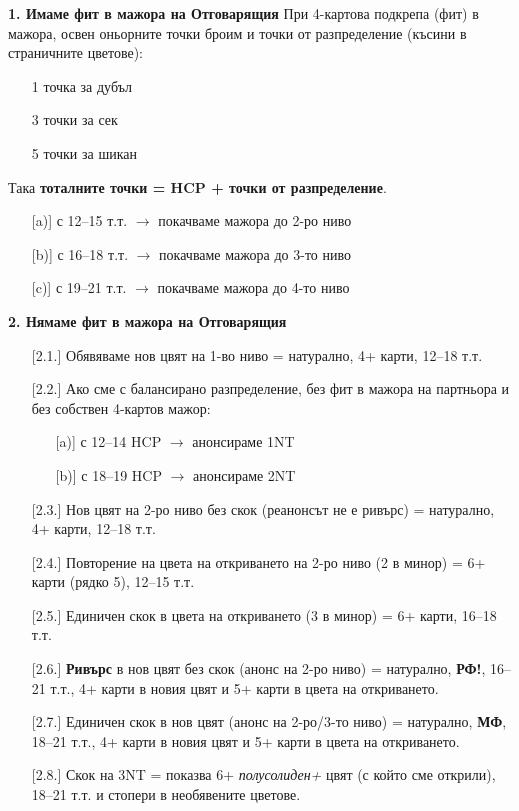 \documentclass[10pt,a5paper]{extarticle}
\begin{document}
\textbf{1. Имаме фит в мажора на Отговарящия}
При 4-картова подкрепа (фит) в мажора, освен оньорните точки броим и точки от разпределение (късини в страничните цветове):  
\begin{itemize}
    \item[] 1 точка за дубъл
    \item[] 3 точки за сек
    \item[] 5 точки за шикан
\end{itemize}
Така \textbf{тоталните точки = HCP + точки от разпределение}.
\begin{itemize}
    \item[][a)] с 12–15 т.т. $\rightarrow$ покачваме мажора до 2-ро ниво
    \item[][b)] с 16–18 т.т. $\rightarrow$ покачваме мажора до 3-то ниво
    \item[][c)] с 19–21 т.т. $\rightarrow$ покачваме мажора до 4-то ниво
\end{itemize}

\textbf{2. Нямаме фит в мажора на Отговарящия}
\begin{itemize}
    \item[][2.1.] Обявяваме нов цвят на 1-во ниво = натурално, 4+ карти, 12–18 т.т.
    \item[][2.2.] Ако сме с балансирано разпределение, без фит в мажора на партньора и без собствен 4-картов мажор:
        \begin{itemize}
            \item[][a)] с 12–14 HCP $\rightarrow$ анонсираме 1NT
            \item[][b)] с 18–19 HCP $\rightarrow$ анонсираме 2NT
        \end{itemize}
    \item[][2.3.] Нов цвят на 2-ро ниво без скок (реанонсът не е ривърс) = натурално, 4+ карти, 12–18 т.т.
    \item[][2.4.] Повторение на цвета на откриването на 2-ро ниво (2 в минор) = 6+ карти (рядко 5), 12–15 т.т.
    \item[][2.5.] Единичен скок в цвета на откриването (3 в минор) = 6+ карти, 16–18 т.т.
    \item[][2.6.] \textbf{Ривърс} в нов цвят без скок (анонс на 2-ро ниво) = натурално, \textbf{РФ!}, 16–21 т.т., 4+ карти в новия цвят и 5+ карти в цвета на откриването.
    \item[][2.7.] Единичен скок в нов цвят (анонс на 2-ро/3-то ниво) = натурално, \textbf{МФ}, 18–21 т.т., 4+ карти в новия цвят и 5+ карти в цвета на откриването.
    \item[][2.8.] Скок на 3NT = показва 6+ \emph{полусолиден+} цвят (с който сме открили), 18–21 т.т. и стопери в необявените цветове.
\end{itemize}
\end{document}
